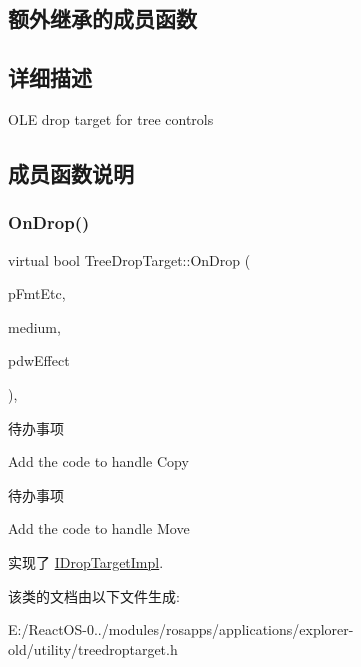 \subsection*{额外继承的成员函数}


\subsection{详细描述}
O\+LE drop target for tree controls 

\subsection{成员函数说明}
\mbox{\label{class_tree_drop_target_a068695082ff9d2081042b792205b538a}} 
\subsubsection{\texorpdfstring{On\+Drop()}{OnDrop()}}
{\footnotesize\ttfamily virtual bool Tree\+Drop\+Target\+::\+On\+Drop (\begin{DoxyParamCaption}\item[{F\+O\+R\+M\+A\+T\+E\+TC $\ast$}]{p\+Fmt\+Etc,  }\item[{S\+T\+G\+M\+E\+D\+I\+UM \&}]{medium,  }\item[{D\+W\+O\+RD $\ast$}]{pdw\+Effect }\end{DoxyParamCaption})\hspace{0.3cm}{\ttfamily [inline]}, {\ttfamily [virtual]}}

\begin{DoxyRefDesc}{待办事项}
\item[\hyperlink{todo__todo000082}{待办事项}]Add the code to handle Copy \end{DoxyRefDesc}


\begin{DoxyRefDesc}{待办事项}
\item[\hyperlink{todo__todo000083}{待办事项}]Add the code to handle Move \end{DoxyRefDesc}


实现了 \hyperlink{class_i_drop_target_impl}{I\+Drop\+Target\+Impl}.



该类的文档由以下文件生成\+:\begin{DoxyCompactItemize}
\item 
E\+:/\+React\+O\+S-\/0../modules/rosapps/applications/explorer-\/old/utility/treedroptarget.\+h\end{DoxyCompactItemize}
